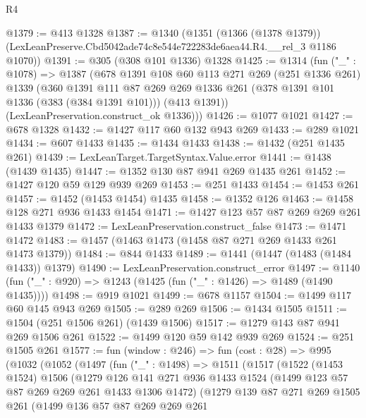 \begin{lexlean}{R4}
\begin{coremodule}
@1379 := @413 @1328
@1387 := @1340
    (@1351
      (@1366 (@1378 @1379))
      (LexLeanPreserve.Cbd5042ade74c8e544e722283de6aea44.R4.__rel_3 @1186 @1070))
@1391 := @305 (@308 @101 @1336) @1328
@1425 := @1314
    (fun ("_" : @1078) =>
    @1387
      (@678
        @1391
        @108
        @60
        @113
        @271
        @269
        (@251 @1336 @261)
        @1339
        (@360
          @1391
          @111
          @87
          @269
          @269
          @1336
          @261
          (@378 @1391 @101 @1336 (@383 (@384 @1391 @101)))
          (@413 @1391))
        (LexLeanPreservation.construct_ok @1336)))
@1426 := @1077 @1021
@1427 := @678 @1328
@1432 := @1427 @117 @60 @132 @943 @269
@1433 := @289 @1021
@1434 := @607 @1433
@1435 := @1434 @1433
@1438 := @1432 (@251 @1435 @261)
@1439 := LexLeanTarget.TargetSyntax.Value.error
@1441 := @1438 (@1439 @1435)
@1447 := @1352 @130 @87 @941 @269 @1435 @261
@1452 := @1427 @120 @59 @129 @939 @269
@1453 := @251 @1433
@1454 := @1453 @261
@1457 := @1452 (@1453 @1454) @1435
@1458 := @1352 @126
@1463 := @1458 @128 @271 @936 @1433 @1454
@1471 := @1427 @123 @57 @87 @269 @269 @261 @1433 @1379
@1472 := LexLeanPreservation.construct_false
@1473 := @1471 @1472
@1483 := @1457 (@1463 @1473 (@1458 @87 @271 @269 @1433 @261 @1473 @1379))
@1484 := @844 @1433
@1489 := @1441 (@1447 (@1483 (@1484 @1433)) @1379)
@1490 := LexLeanPreservation.construct_error
@1497 := @1140 (fun ("_" : @920) => @1243 (@1425 (fun ("_" : @1426) => @1489 (@1490 @1435))))
@1498 := @919 @1021
@1499 := @678 @1157
@1504 := @1499 @117 @60 @145 @943 @269
@1505 := @289 @269
@1506 := @1434 @1505
@1511 := @1504 (@251 @1506 @261) (@1439 @1506)
@1517 := @1279 @143 @87 @941 @269 @1506 @261
@1522 := @1499 @120 @59 @142 @939 @269
@1524 := @251 @1505 @261
@1577 := fun (window : @246) =>
  fun (cost : @28) =>
  @995
    (@1032
      (@1052
        (@1497
          (fun ("_" : @1498) =>
          @1511
            (@1517
              (@1522
                (@1453 @1524)
                @1506
                (@1279
                  @126
                  @141
                  @271
                  @936
                  @1433
                  @1524
                  (@1499 @123 @57 @87 @269 @269 @261 @1433 @1306 @1472)
                  (@1279
                    @139
                    @87
                    @271
                    @269
                    @1505
                    @261
                    (@1499
                      @136
                      @57
                      @87
                      @269
                      @269
                      @261

\end{coremodule}
\end{lexlean}
